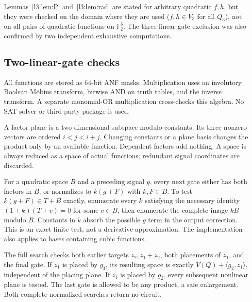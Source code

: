 \documentclass[11pt,a4paper]{article}
\theoremstyle{plain}
\theoremstyle{remark}
\newcommand{\F}{\mathbb F_2}
\begin{document}
Lemmas~\ref{l3:lem:P} and~\ref{l3:lem:rad} are stated for arbitrary quadratic $f,h$, but they were checked on the domain where they are used ($f,h\in V_3$ for all $Q_3$), not on all pairs of quadratic functions on $\F^6$. The three-linear-gate exclusion was also confirmed by two independent exhaustive computations.
\subsection{Two-linear-gate checks}

All functions are stored as 64-bit ANF masks. Multiplication uses an involutory Boolean M\"obius transform, bitwise AND on truth tables, and the inverse transform. A separate monomial-OR multiplication cross-checks this algebra. No SAT solver or third-party package is used.

A factor plane is a two-dimensional subspace modulo constants. Its three nonzero vectors are ordered $i<j<i+j$. Changing constants or a plane basis changes the product only by an available function. Dependent factors add nothing. A space is always reduced as a space of actual functions; redundant signal coordinates are discarded.

For a quadratic space $B$ and a preceding signal $g$, every next gate either has both factors in $B$, or normalizes to $k(g+F)$ with $k,F\in B$. To test $k(g+F)\in T+B$ exactly, enumerate every $k$ satisfying the necessary identity $(1+k)(T+v)=0$ for some $v\in B$, then enumerate the complete image $kB$ modulo $B$. Constants in $k$ absorb the possible $g$ term in the output correction. This is an exact finite test, not a derivative approximation. The implementation also applies to bases containing cubic functions.

The full search checks both earlier targets $z_2,z_1+z_2$, both placements of $z_1$, and the final gate. If $z_1$ is placed by $g_3$, its resulting space is exactly $V(Q)+\langle g_2,z_1\rangle$, independent of the placing plane. If $z_1$ is placed by $g_2$, every subsequent nonlinear plane is tested. The last gate is allowed to be any product, a safe enlargement. Both complete normalized searches return no circuit.
\end{document}
